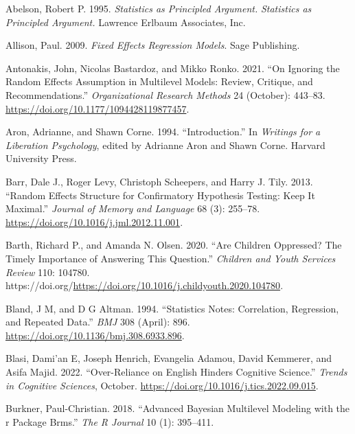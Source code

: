 \documentclass[
  letterpaper,
  DIV=11,
  numbers=noendperiod]{scrreprt}
\newlength{\cslhangindent}
\newlength{\cslentryspacingunit} %
\newenvironment{CSLReferences}[2] %
 {%
  \setlength{\parindent}{0pt}
  \ifodd #1
  \let\oldpar\par
  \def\par{\hangindent=\cslhangindent\oldpar}
  \fi
  \setlength{\parskip}{#2\cslentryspacingunit}
 }%
 {}
\begin{document}

\hypertarget{refs}{}
\begin{CSLReferences}{1}{0}
\leavevmode{}%
Abelson, Robert P. 1995. \emph{Statistics as Principled Argument.}
\emph{Statistics as Principled Argument.} Lawrence Erlbaum Associates,
Inc.

\leavevmode{}%
Allison, Paul. 2009. \emph{Fixed Effects Regression Models}. Sage
Publishing.

\leavevmode{}%
Antonakis, John, Nicolas Bastardoz, and Mikko Ronko. 2021. {``On
Ignoring the Random Effects Assumption in Multilevel Models: Review,
Critique, and Recommendations.''} \emph{Organizational Research Methods}
24 (October): 443--83. \url{https://doi.org/10.1177/1094428119877457}.

\leavevmode{}%
Aron, Adrianne, and Shawn Corne. 1994. {``Introduction.''} In
\emph{Writings for a Liberation Psychology}, edited by Adrianne Aron and
Shawn Corne. Harvard University Press.

\leavevmode{}%
Barr, Dale J., Roger Levy, Christoph Scheepers, and Harry J. Tily. 2013.
{``Random Effects Structure for Confirmatory Hypothesis Testing: Keep It
Maximal.''} \emph{Journal of Memory and Language} 68 (3): 255--78.
\url{https://doi.org/10.1016/j.jml.2012.11.001}.

\leavevmode{}%
Barth, Richard P., and Amanda N. Olsen. 2020. {``Are Children Oppressed?
The Timely Importance of Answering This Question.''} \emph{Children and
Youth Services Review} 110: 104780.
https://doi.org/\url{https://doi.org/10.1016/j.childyouth.2020.104780}.

\leavevmode{}%
Bland, J M, and D G Altman. 1994. {``Statistics Notes: Correlation,
Regression, and Repeated Data.''} \emph{BMJ} 308 (April): 896.
\url{https://doi.org/10.1136/bmj.308.6933.896}.

\leavevmode{}%
Blasi, Dami'an E, Joseph Henrich, Evangelia Adamou, David Kemmerer, and
Asifa Majid. 2022. {``Over-Reliance on {E}nglish Hinders Cognitive
Science.''} \emph{Trends in Cognitive Sciences}, October.
\url{https://doi.org/10.1016/j.tics.2022.09.015}.

\leavevmode{}%
Burkner, Paul-Christian. 2018. {``Advanced {B}ayesian Multilevel
Modeling with the r Package Brms.''} \emph{The R Journal} 10 (1):
395--411.


\end{CSLReferences}
\end{document}
